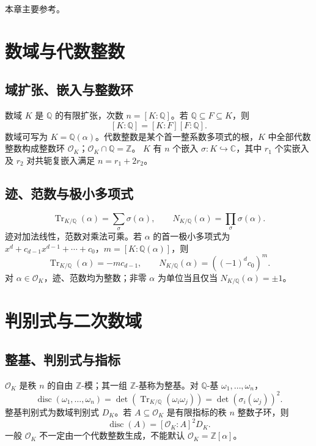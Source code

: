 \documentclass[../main.tex]{subfiles}
\begin{document}
本章主要参考\cite{milneANT}。

\section{数域与代数整数}
\subsection{域扩张、嵌入与整数环}
数域 $K$ 是 $\mathbb Q$ 的有限扩张，次数 $n=[K:\mathbb Q]$。若 $\mathbb Q\subseteq F\subseteq K$，则
\[
[K:\mathbb Q]=[K:F][F:\mathbb Q].
\]
数域可写为 $K=\mathbb Q(\alpha)$。代数整数是某个首一整系数多项式的根，$K$ 中全部代数整数构成整数环 $\mathcal O_K$；$\mathcal O_K\cap\mathbb Q=\mathbb Z$。
$K$ 有 $n$ 个嵌入 $\sigma:K\hookrightarrow\mathbb C$，其中 $r_1$ 个实嵌入及 $r_2$ 对共轭复嵌入满足 $n=r_1+2r_2$。
\subsection{迹、范数与极小多项式}
\[
\operatorname{Tr}_{K/\mathbb Q}(\alpha)=\sum_\sigma\sigma(\alpha),\qquad
N_{K/\mathbb Q}(\alpha)=\prod_\sigma\sigma(\alpha).
\]
迹对加法线性，范数对乘法可乘。若 $\alpha$ 的首一极小多项式为 $x^d+c_{d-1}x^{d-1}+\cdots+c_0$，$m=[K:\mathbb Q(\alpha)]$，则
\[
\operatorname{Tr}_{K/\mathbb Q}(\alpha)=-mc_{d-1},\qquad
N_{K/\mathbb Q}(\alpha)=((-1)^dc_0)^m.
\]
对 $\alpha\in\mathcal O_K$，迹、范数均为整数；非零 $\alpha$ 为单位当且仅当 $N_{K/\mathbb Q}(\alpha)=\pm1$。
\section{判别式与二次数域}
\subsection{整基、判别式与指标}
$\mathcal O_K$ 是秩 $n$ 的自由 $\mathbb Z$-模；其一组 $\mathbb Z$-基称为整基。对 $\mathbb Q$-基 $\omega_1,\ldots,\omega_n$，
\[
\operatorname{disc}(\omega_1,\ldots,\omega_n)
=\det(\operatorname{Tr}_{K/\mathbb Q}(\omega_i\omega_j))
=\det(\sigma_i(\omega_j))^2.
\]
整基判别式为数域判别式 $D_K$。若 $A\subseteq\mathcal O_K$ 是有限指标的秩 $n$ 整数子环，则
\[
\operatorname{disc}(A)=[\mathcal O_K:A]^2D_K.
\]
一般 $\mathcal O_K$ 不一定由一个代数整数生成，不能默认 $\mathcal O_K=\mathbb Z[\alpha]$。
\end{document}
